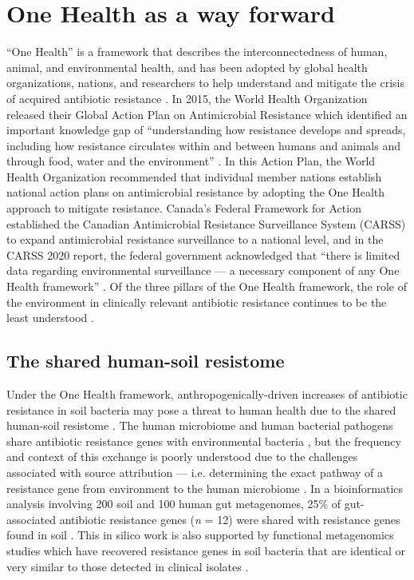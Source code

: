 \section{One Health as a way forward}

“One Health” is a framework that describes the interconnectedness of human, animal, and environmental health, and has been adopted by global health organizations, nations, and researchers to help understand and mitigate the crisis of acquired antibiotic resistance \parencite{Tiedje.2019}.
In 2015, the World Health Organization released their Global Action Plan on Antimicrobial Resistance which identified an important knowledge gap of “understanding how resistance develops and spreads, including how resistance circulates within and between humans and animals and through food, water and the environment” \parencite{WorldHealthOrganization.2015}.
In this Action Plan, the World Health Organization recommended that individual member nations establish national action plans on antimicrobial resistance by adopting the One Health approach to mitigate resistance.
Canada’s Federal Framework for Action established the Canadian Antimicrobial Resistance Surveillance System (CARSS) to expand antimicrobial resistance surveillance to a national level, and in the CARSS 2020 report, the federal government acknowledged that “there is limited data regarding environmental surveillance — a necessary component of any One Health framework” \parencite{PublicHealthAgencyofCanada.2014, PublicHealthAgencyofCanada.2020}.
Of the three pillars of the One Health framework, the role of the environment in clinically relevant antibiotic resistance continues to be the least understood \parencite{Robinson.2016}.

\subsection{The shared human-soil resistome}

Under the One Health framework, anthropogenically-driven increases of antibiotic resistance in soil bacteria may pose a threat to human health due to the shared human-soil resistome \parencite{Forsberg.2012}.
The human microbiome and human bacterial pathogens share antibiotic resistance genes with environmental bacteria \parencite{Forsberg.2012, Smillie.2011, Pal.2016}, but the frequency and context of this exchange is poorly understood \parencite{Berendonk.2015, Huijbers.2015} due to the challenges associated with source attribution --- i.e. determining the exact pathway of a resistance gene from environment to the human microbiome \parencite{Tiedje.2019, Li.2018}.
In a bioinformatics analysis involving 200 soil and 100 human gut metagenomes, 25\% of gut-associated antibiotic resistance genes (\textit{n} = 12) were shared with resistance genes found in soil \parencite{Pal.2016}.
This in silico work is also supported by functional metagenomics studies which have recovered resistance genes in soil bacteria that are identical or very similar to those detected in clinical isolates \parencite{Forsberg.2012, Lau.2017b, Allen.2009}.

